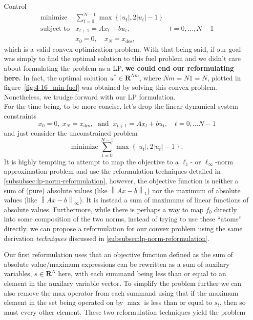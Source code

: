 \begin{chapter}{Control}
    \[\begin{array}{lll}
        \text{minimize} \; & \sum_{t=0}^{N-1} \max \left\{ \left| u_t \right|, 2 \left| u_t \right| - 1 \right\} & \\
        \text{subject to} & x_{t+1} = Ax_t + bu_t, \; & t=0, \ldots, N-1 \\
        & x_0 = 0, \quad x_{N} = x_{\text{des}},
        \end{array}\]
    which is a valid convex optimization problem. With that being said, if our goal was
    simply to find the optimal solution to this fuel problem and we didn't care about 
    formulating the problem as a LP, \textbf{we could end our reformulating here.} In fact,
    the optimal solution $u^* \in \mathbf{R}^{Nm}$, where $Nm = N1 = N$, plotted in figure~\ref{fig:4-16_min-fuel}
    was obtained by solving this convex problem. 
    Nonetheless, we trudge forward with our LP formulation.\\
    For the time being, to be more concise, let's drop the linear dynamical system constraints
    \[x_0 = 0, \; x_N = x_{\text{des}}, \; \text{ and } \; x_{t+1} = Ax_t + bu_t, \quad t = 0, \ldots N-1\]
    and just consider the unconstrained problem
    \[\text{minimize} \; \sum_{t=0}^{N-1} \max \left\{ \left| u_t \right|, 2 \left| u_t \right| - 1 \right\}.\]
    It is highly tempting to attempt to map the objective to a $\ell_1$- or $\ell_\infty$-norm
    approximation problem and use the reformulation techniques detailed in \hyperref[subsubsec:lp-norm-reformulation]{\ref{subsubsec:lp-norm-reformulation}},
    however, the objective function is neither a sum of (pure) absolute values (like $\left\lVert Ax - b \right\rVert_{1}$)
    nor the maximum of absolute values (like $\left\lVert Ax - b \right\rVert_{\infty}$).
    It is instead a sum of maximums of linear functions of absolute values.
    Furthermore, while there is perhaps a way to map $f_0$ directly into some composition of the two norms,
    instead of trying to use these ``atoms'' directly, we can propose a reformulation
    for our convex problem using the same derivation \textit{techniques} discussed in \hyperref[subsubsec:lp-norm-reformulation]{\ref{subsubsec:lp-norm-reformulation}}.

    Our first reformulation uses that an objective function defined as the sum of absolute value/maximum expressions can be rewritten
    as a sum of auxilary variables, $s \in \mathbf{R}^N$ here, with each summand being less than
    or equal to an element in the auxilary variable vector. To simplify the problem further we can also 
    remove the max operator from each summand using that if the maximum element in the set
    being operated on by $\max$ is less than or equal to $s_t$, then so must every other element.
    These two reformulation techniques yield the problem


\end{chapter}
